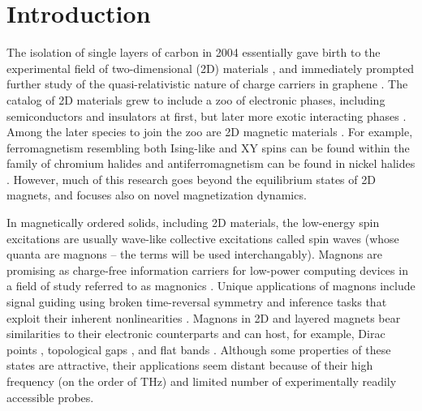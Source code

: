 \documentclass[aps,prx,twocolumn,superscriptaddress,floatfix]{revtex4-2}
\begin{document}
\section{Introduction}
The isolation of single layers of carbon in 2004 essentially gave birth to the experimental field of two-dimensional (2D) materials \cite{novoselov_electric_2004}, and immediately prompted further study of the quasi-relativistic nature of charge carriers in graphene \cite{katsnelson_chiral_2006, li_observation_2007, guinea_energy_2010}. The catalog of 2D materials grew to include a zoo of electronic phases, including semiconductors \cite{podzorov_high-mobility_2004} and insulators \cite{novoselov_two-dimensional_2005} at first, but later more exotic interacting phases \cite{ugeda_characterization_2016,cao_unconventional_2018,zeng_thermodynamic_2023}. Among the later species to join the zoo are 2D magnetic materials \cite{han_graphene_2014,huang_layer-dependent_2017,gong_discovery_2017}. For example, ferromagnetism resembling both Ising-like and XY spins can be found within the family of chromium halides \cite{liu_thickness-dependent_2019, bedoya-pinto_intrinsic_2021} and antiferromagnetism can be found in nickel halides \cite{ liu_vapor_2020,bikaljevic_noncollinear_2021}. However, much of this research goes beyond the equilibrium states of 2D magnets, and focuses also on novel magnetization dynamics. 

In magnetically ordered solids, including 2D materials, the low-energy spin excitations are usually wave-like collective excitations called spin waves (whose quanta are magnons -- the terms will be used interchangably). Magnons are promising as charge-free information carriers for low-power computing devices in a field of study referred to as magnonics \cite{kruglyak_magnonics_2010, serga_yig_2010, chumak_magnon_2015}. Unique applications of magnons include signal guiding using broken time-reversal symmetry and inference tasks that exploit their inherent nonlinearities \cite{wang_inverse-design_2021, papp_nanoscale_2021, zenbaa_universal_2025, korber_pattern_2023}.
Magnons in 2D and layered magnets bear similarities to their electronic counterparts and can host, for example, Dirac points \cite{schneeloch_gapless_2022}, topological gaps \cite{chen_topological_2018}, and flat bands \cite{riberolles_chiral_2024}. Although some properties of these states are attractive, their applications seem distant because of their high frequency (on the order of THz) and limited number of experimentally readily accessible probes.
\end{document}
